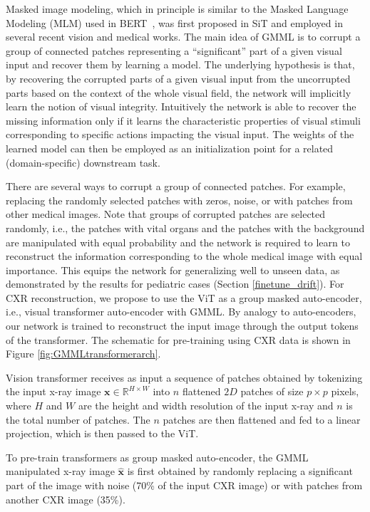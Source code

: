 \documentclass[10pt,journal,compsoc]{IEEEtran}
\begin{document}
Masked image modeling, which in principle is similar to the Masked Language Modeling (MLM) used in BERT~\cite{devlin2018bert}, was first proposed in SiT \cite{atito2021sit} and employed in several recent vision \cite{bao2021beit,atito2021mc,xie2022simmim} and medical \cite{atito2022sb,chen2022masked} works. 
The main idea of GMML is to corrupt a group of connected patches representing a ``significant'' part of a given visual input and recover them by learning a model. The underlying hypothesis is that, by recovering the corrupted parts of a given visual input from the uncorrupted parts based on the context of the whole visual field, the network will implicitly learn the notion of visual integrity. Intuitively the network is able to recover the missing information only if it learns the characteristic properties of visual stimuli corresponding to specific actions impacting the visual input. The weights of the learned model can then be employed as an initialization point for a related (domain-specific) downstream task. 

There are several ways to corrupt a group of connected patches. For example, replacing the randomly selected patches with zeros, noise, or with patches from other medical images. Note that groups of corrupted patches are selected randomly, i.e., the patches with vital organs and the patches with the background are manipulated with equal probability and the network is required to learn to reconstruct the information corresponding to the whole medical image with equal importance. This equips the network for generalizing well to unseen data, as demonstrated by the results for pediatric cases (Section \ref{finetune_drift}).
For CXR reconstruction, we propose to use the ViT as a group masked auto-encoder, i.e., visual transformer auto-encoder with GMML. By analogy to auto-encoders, our network is trained to reconstruct the input image through the output tokens of the transformer. The schematic for pre-training using CXR data is shown in Figure \ref{fig:GMMLtransformerarch}. 

Vision transformer receives as input a sequence of patches obtained by tokenizing the input x-ray image $\mathbf{x} \in \mathbb{R}^{H \times W}$ into $n$ flattened $2D$ patches of size $p \times p$ pixels, where $H$ and $W$ are the height and width resolution of the input x-ray and $n$ is the total number of patches. The $n$ patches are then flattened and fed to a linear projection, which is then passed to the ViT. 

To pre-train transformers as group masked auto-encoder, the GMML manipulated x-ray image $\mathbf{\hat{x}}$ is first obtained by randomly replacing a significant part of the image with noise (70\% of the input CXR image) or with patches from another CXR image (35\%). 
\end{document}
